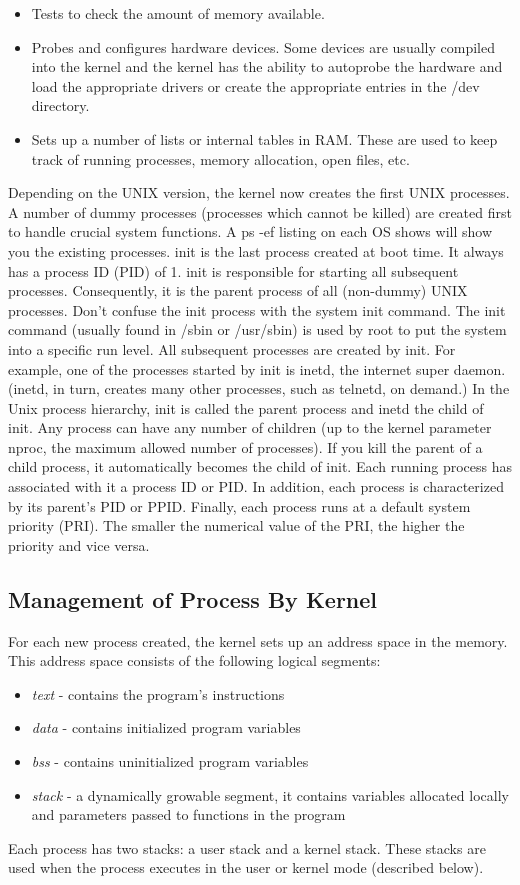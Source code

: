 \documentclass{article}
\begin{document}
\begin{itemize}
    \item Tests to check the amount of memory available.
    \item Probes and configures hardware devices. Some devices are usually compiled
    into the kernel and the kernel has the ability to autoprobe the hardware and load
    the appropriate drivers or create the appropriate entries in the /dev directory.
    \item Sets up a number of lists or internal tables in RAM. These are used to keep track
    of running processes, memory allocation, open files, etc.
\end{itemize}
Depending on the UNIX version, the kernel now creates the first UNIX processes. A
number of dummy processes (processes which cannot be killed) are created first to
handle crucial system functions. A ps -ef listing on each OS shows will show you the
existing processes. init is the last process created at boot time. It always has a process
ID (PID) of 1. init is responsible for starting all subsequent processes. Consequently,
it is the parent process of all (non-dummy) UNIX processes.
Don’t confuse the init process with the system init command. The init command
(usually found in /sbin or /usr/sbin) is used by root to put the system into a specific
run level.
All subsequent processes are created by init. For example, one of the processes started
by init is inetd, the internet super daemon. (inetd, in turn, creates many other
processes, such as telnetd, on demand.) In the Unix process hierarchy, init is called the
parent process and inetd the child of init. Any process can have any number of
children (up to the kernel parameter nproc, the maximum allowed number of
processes). If you kill the parent of a child process, it automatically becomes the child
of init.
Each running process has associated with it a process ID or PID. In addition, each
process is characterized by its parent’s PID or PPID. Finally, each process runs at a
default system priority (PRI). The smaller the numerical value of the PRI, the higher
the priority and vice versa.
\subsection{Management of Process By Kernel}
For each new process created, the kernel sets up an address space in the memory. This
address space consists of the following logical segments:

\begin{itemize}
    \item \emph{text} - contains the program's instructions
    \item \emph{data} - contains initialized program variables
    \item \emph{bss} - contains uninitialized program variables
    \item \emph{stack} -  a dynamically growable segment, it contains variables allocated locally and parameters passed to functions in the program
\end{itemize}
Each process has two stacks: a user stack and a kernel stack. These stacks are used
when the process executes in the user or kernel mode (described below).
\end{document}
